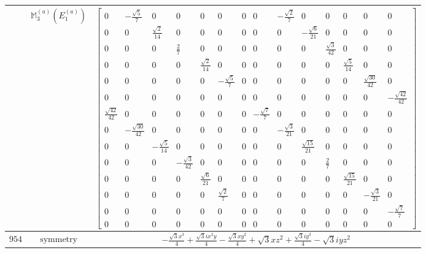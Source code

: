 \documentclass[fleqn,8pt,landscape]{jsarticle}
\begin{document}
\begin{longtable}{ccc}
$  $ & $ \mathbb{M}_{3}^{(a)}(E_{1}^{(a)}) $ & $ \begin{bmatrix} 0 & - \frac{\sqrt{5}}{7} & 0 & 0 & 0 & 0 & 0 & 0 & - \frac{\sqrt{2}}{7} & 0 & 0 & 0 & 0 & 0 \\ 0 & 0 & \frac{\sqrt{2}}{14} & 0 & 0 & 0 & 0 & 0 & 0 & - \frac{\sqrt{6}}{21} & 0 & 0 & 0 & 0 \\ 0 & 0 & 0 & \frac{2}{7} & 0 & 0 & 0 & 0 & 0 & 0 & \frac{\sqrt{3}}{42} & 0 & 0 & 0 \\ 0 & 0 & 0 & 0 & \frac{\sqrt{2}}{14} & 0 & 0 & 0 & 0 & 0 & 0 & \frac{\sqrt{5}}{14} & 0 & 0 \\ 0 & 0 & 0 & 0 & 0 & - \frac{\sqrt{5}}{7} & 0 & 0 & 0 & 0 & 0 & 0 & \frac{\sqrt{30}}{42} & 0 \\ 0 & 0 & 0 & 0 & 0 & 0 & 0 & 0 & 0 & 0 & 0 & 0 & 0 & - \frac{\sqrt{42}}{42} \\ \frac{\sqrt{42}}{42} & 0 & 0 & 0 & 0 & 0 & 0 & - \frac{\sqrt{7}}{7} & 0 & 0 & 0 & 0 & 0 & 0 \\ 0 & - \frac{\sqrt{30}}{42} & 0 & 0 & 0 & 0 & 0 & 0 & - \frac{\sqrt{3}}{21} & 0 & 0 & 0 & 0 & 0 \\ 0 & 0 & - \frac{\sqrt{5}}{14} & 0 & 0 & 0 & 0 & 0 & 0 & \frac{\sqrt{15}}{21} & 0 & 0 & 0 & 0 \\ 0 & 0 & 0 & - \frac{\sqrt{3}}{42} & 0 & 0 & 0 & 0 & 0 & 0 & \frac{2}{7} & 0 & 0 & 0 \\ 0 & 0 & 0 & 0 & \frac{\sqrt{6}}{21} & 0 & 0 & 0 & 0 & 0 & 0 & \frac{\sqrt{15}}{21} & 0 & 0 \\ 0 & 0 & 0 & 0 & 0 & \frac{\sqrt{2}}{7} & 0 & 0 & 0 & 0 & 0 & 0 & - \frac{\sqrt{3}}{21} & 0 \\ 0 & 0 & 0 & 0 & 0 & 0 & 0 & 0 & 0 & 0 & 0 & 0 & 0 & - \frac{\sqrt{7}}{7} \\ 0 & 0 & 0 & 0 & 0 & 0 & 0 & 0 & 0 & 0 & 0 & 0 & 0 & 0 \end{bmatrix} $ \\ \hline
$ 954 $ & $ \text{symmetry} $ & $ - \frac{\sqrt{3} x^{3}}{4} + \frac{\sqrt{3} i x^{2} y}{4} - \frac{\sqrt{3} x y^{2}}{4} + \sqrt{3} x z^{2} + \frac{\sqrt{3} i y^{3}}{4} - \sqrt{3} i y z^{2} $ \\

\end{longtable}
\end{document}
